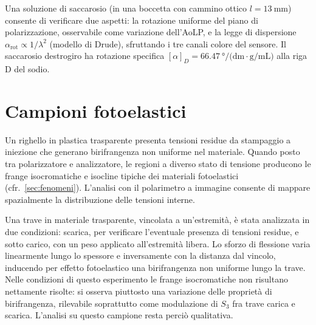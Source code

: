 Una soluzione di saccarosio (in una boccetta con cammino ottico $l = \SI{13}{\milli\meter}$) consente di verificare due aspetti: la rotazione uniforme del piano di polarizzazione, osservabile come variazione dell'AoLP, e la legge di dispersione $\alpha_\text{rot} \propto 1/\lambda^2$ (modello di Drude), sfruttando i tre canali colore del sensore. Il saccarosio destrogiro ha rotazione specifica $[\alpha]_D = \SI{66.47}{\degree\per(\deci\meter\cdot\gram\per\milli\liter)}$ alla riga D del sodio.


\section{Campioni fotoelastici}
\label{sec:campioni-fotoelastici}

Un righello in plastica trasparente presenta tensioni residue da stampaggio a iniezione che generano birifrangenza non uniforme nel materiale. Quando posto tra polarizzatore e analizzatore, le regioni a diverso stato di tensione producono le frange isocromatiche e isocline tipiche dei materiali fotoelastici (cfr.\ \cref{sec:fenomeni}). L'analisi con il polarimetro a immagine consente di mappare spazialmente la distribuzione delle tensioni interne.

Una trave in materiale trasparente, vincolata a un'estremità, è stata analizzata in due condizioni: scarica, per verificare l'eventuale presenza di tensioni residue, e sotto carico, con un peso applicato all'estremità libera. %
Lo sforzo di flessione varia linearmente lungo lo spessore e inversamente con la distanza dal vincolo, inducendo per effetto fotoelastico una birifrangenza non uniforme lungo la trave. Nelle condizioni di questo esperimento le frange isocromatiche non risultano nettamente risolte: si osserva piuttosto una variazione delle proprietà di birifrangenza, rilevabile soprattutto come modulazione di $S_3$ fra trave carica e scarica. L'analisi su questo campione resta perciò qualitativa.